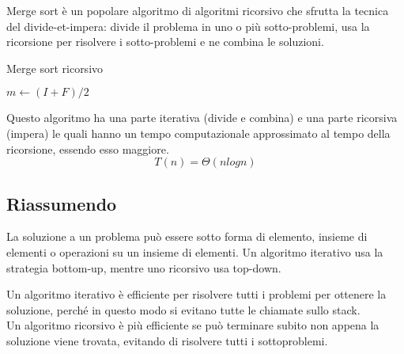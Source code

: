 Merge sort è un popolare algoritmo di algoritmi ricorsivo che sfrutta la tecnica del divide-et-impera: divide il problema in uno o più sotto-problemi, usa la ricorsione per risolvere i sotto-problemi e ne combina le soluzioni. \par
\begin{algorithm}
	\caption{Merge sort ricorsivo}
	\label{alg:msr}
	\begin{algorithmic}
			\State $m \gets (I + F) / 2$
			\State {}
			\State {}
			\State {}
		\EndFunction
	\end{algorithmic}
\end{algorithm}
Questo algoritmo ha una parte iterativa (divide e combina) e una parte ricorsiva (impera) le quali hanno un tempo computazionale approssimato al tempo della ricorsione, essendo esso maggiore.
$$T(n) = \Theta(n log n)$$

\subsection{Riassumendo}
La soluzione a un problema può essere sotto forma di elemento, insieme di elementi o operazioni su un insieme di elementi. Un algoritmo iterativo usa la strategia bottom-up, mentre uno ricorsivo usa top-down. \par 

Un algoritmo iterativo è efficiente per risolvere tutti i problemi per ottenere la soluzione, perché in questo modo si evitano tutte le chiamate sullo stack. \\
Un algoritmo ricorsivo è più efficiente se può terminare subito non appena la soluzione viene trovata, evitando di risolvere tutti i sottoproblemi.
